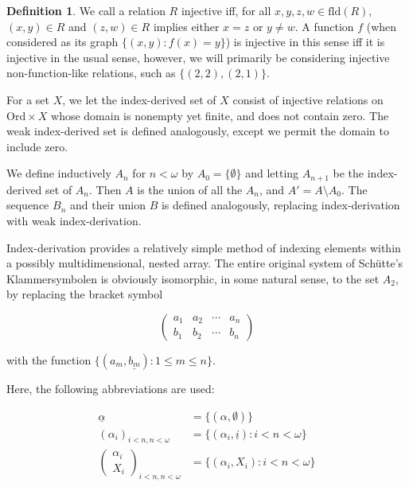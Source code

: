 \documentclass{article}
\theoremstyle{definition}
\newtheorem{definition}{Definition}[section]
\theoremstyle{plain}
\theoremstyle{plain}
\theoremstyle{plain}
\theoremstyle{plain}
\theoremstyle{remark}
\theoremstyle{remark}
\theoremstyle{remark}
\theoremstyle{plain}
\theoremstyle{plain}
\begin{document}
\begin{definition}
We call a relation $R$ injective iff, for all $x, y, z, w \in \mathrm{fld}(R)$, $(x,y) \in R$ and $(z,w) \in R$ implies either $x = z$ or $y \neq w$. A function $f$ (when considered as its graph $\{(x,y): f(x) = y\}$) is injective in this sense iff it is injective in the usual sense, however, we will primarily be considering injective non-function-like relations, such as $\{(2,2), (2,1)\}$.

For a set $X$, we let the index-derived set of $X$ consist of injective relations on $\mathrm{Ord} \times X$ whose domain is nonempty yet finite, and does not contain zero. The weak index-derived set is defined analogously, except we permit the domain to include zero.

We define inductively $A_n$ for $n < \omega$ by $A_0 = \{\emptyset\}$ and letting $A_{n+1}$ be the index-derived set of $A_n$. Then $A$ is the union of all the $A_n$, and $A' = A \setminus A_0$. The sequence $B_n$ and their union $B$ is defined analogously, replacing index-derivation with weak index-derivation.
\end{definition}

Index-derivation provides a relatively simple method of indexing elements within a possibly multidimensional, nested array. The entire original system of Schütte's Klammersymbolen is obviously isomorphic, in some natural sense, to the set $A_2$, by replacing the bracket symbol

\begin{equation}
\left(\begin{matrix} a_1 & a_2 & \cdots & a_n \\ b_1 & b_2 & \cdots & b_n \end{matrix} \right)
\end{equation}

with the function $\{(a_m, \underline{b_m}): 1 \leq m \leq n\}$.

Here, the following abbreviations are used:

\begin{equation}
\begin{split}
\underline{\alpha} & = \{(\alpha,\emptyset)\} \\ (\alpha_i)_{i < n, n < \omega} & = \{(\alpha_i, \underline{i}): i < n < \omega\} \\ \left(\begin{matrix} \alpha_i \\ X_i\end{matrix} \right)_{i < n, n < \omega} & = \{(\alpha_i, X_i): i < n < \omega\}
\end{split}
\end{equation}
\end{document}
